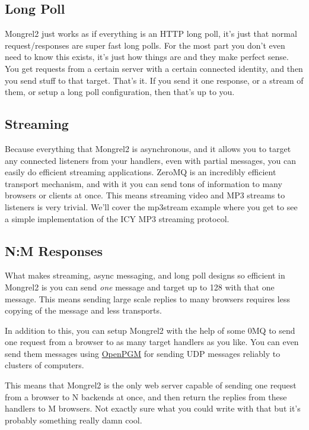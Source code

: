 \subsection{Long Poll}

Mongrel2 just works as if everything is an HTTP long poll, it's just that normal request/responses
are super fast long polls.  For the most part you don't even need to know this exists, it's just
how things are and they make perfect sense.  You get requests from a certain server with a 
certain connected identity, and then you send stuff to that target.  That's it.  If you send it
one response, or a stream of them, or setup a long poll configuration, then that's up to you.


\subsection{Streaming}

Because everything that Mongrel2 is asynchronous, and it allows you to target any connected listeners
from your handlers, even with partial messages, you can easily do efficient streaming applications.  ZeroMQ
is an incredibly efficient transport mechanism, and with it you can send tons of information to many
browsers or clients at once.  This means streaming video and MP3 streams to listeners is very 
trivial.  We'll cover the mp3stream example where you get to see a simple implementation of the ICY
MP3 streaming protocol.

\subsection{N:M Responses}

What makes streaming, async messaging, and long poll designs so efficient in Mongrel2 is you can send 
\emph{one} message and target up to 128 with that one message.  This means sending large scale replies
to many browsers requires less copying of the message and less transports.

In addition to this, you can setup Mongrel2 with the help of some 0MQ to send
one request from a browser to as many target handlers as you like.  You can
even send them messages using \href{http://code.google.com/p/openpgm/}{OpenPGM}
for sending UDP messages reliably to clusters of computers.

This means that Mongrel2 is the only web server capable of sending one request
from a browser to N backends at once, and then return the replies from these
handlers to M browsers.  Not exactly sure what you could write with that but
it's probably something really damn cool.



